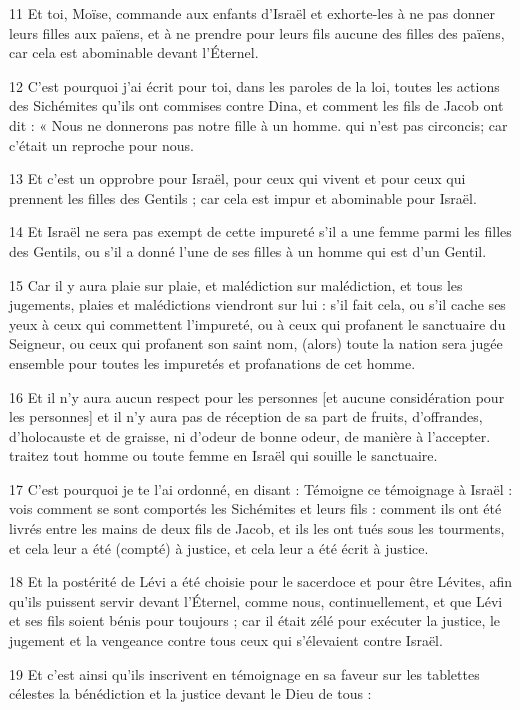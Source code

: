 \par 11 Et toi, Moïse, commande aux enfants d'Israël et exhorte-les à ne pas donner leurs filles aux païens, et à ne prendre pour leurs fils aucune des filles des païens, car cela est abominable devant l'Éternel.
\par 12 C'est pourquoi j'ai écrit pour toi, dans les paroles de la loi, toutes les actions des Sichémites qu'ils ont commises contre Dina, et comment les fils de Jacob ont dit : « Nous ne donnerons pas notre fille à un homme. qui n'est pas circoncis; car c'était un reproche pour nous.
\par 13 Et c'est un opprobre pour Israël, pour ceux qui vivent et pour ceux qui prennent les filles des Gentils ; car cela est impur et abominable pour Israël.
\par 14 Et Israël ne sera pas exempt de cette impureté s'il a une femme parmi les filles des Gentils, ou s'il a donné l'une de ses filles à un homme qui est d'un Gentil.
\par 15 Car il y aura plaie sur plaie, et malédiction sur malédiction, et tous les jugements, plaies et malédictions viendront sur lui : s'il fait cela, ou s'il cache ses yeux à ceux qui commettent l'impureté, ou à ceux qui profanent le sanctuaire du Seigneur, ou ceux qui profanent son saint nom, (alors) toute la nation sera jugée ensemble pour toutes les impuretés et profanations de cet homme.
\par 16 Et il n'y aura aucun respect pour les personnes [et aucune considération pour les personnes] et il n'y aura pas de réception de sa part de fruits, d'offrandes, d'holocauste et de graisse, ni d'odeur de bonne odeur, de manière à l'accepter. traitez tout homme ou toute femme en Israël qui souille le sanctuaire.
\par 17 C'est pourquoi je te l'ai ordonné, en disant : Témoigne ce témoignage à Israël : vois comment se sont comportés les Sichémites et leurs fils : comment ils ont été livrés entre les mains de deux fils de Jacob, et ils les ont tués sous les tourments, et cela leur a été (compté) à justice, et cela leur a été écrit à justice.
\par 18 Et la postérité de Lévi a été choisie pour le sacerdoce et pour être Lévites, afin qu'ils puissent servir devant l'Éternel, comme nous, continuellement, et que Lévi et ses fils soient bénis pour toujours ; car il était zélé pour exécuter la justice, le jugement et la vengeance contre tous ceux qui s'élevaient contre Israël.
\par 19 Et c'est ainsi qu'ils inscrivent en témoignage en sa faveur sur les tablettes célestes la bénédiction et la justice devant le Dieu de tous :
